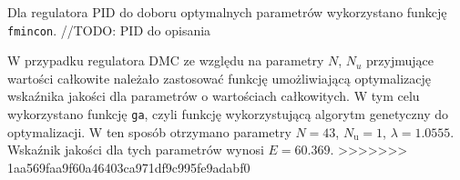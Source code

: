 Dla regulatora PID do doboru optymalnych parametrów wykorzystano funkcję 
\verb+fmincon+. //TODO: PID do opisania

W przypadku regulatora DMC ze względu na parametry $N$, $N_u$ przyjmujące wartości całkowite należało zastosować funkcję umożliwiającą optymalizację wskaźnika jakości dla parametrów o wartościach całkowitych. W tym celu wykorzystano funkcję \verb+ga+, czyli funkcję wykorzystującą algorytm genetyczny do optymalizacji. W ten sposób otrzymano parametry $N=43$, $N_\mathrm{u}=1$, $\lambda=\num{1.0555}$. Wskaźnik jakości dla tych parametrów wynosi $E=\num{60.369}$.
>>>>>>> 1aa569faa9f60a46403ca971df9c995fe9adabf0
